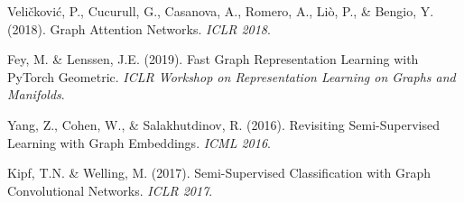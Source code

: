 \documentclass[11pt]{article}
\begin{document}
\begin{enumerate}[leftmargin=*, label={[\arabic*]}]
\item Veli\v{c}kovi\'{c}, P., Cucurull, G., Casanova, A., Romero, A., Li\`{o}, P., \& Bengio, Y. (2018). Graph Attention Networks. \textit{ICLR 2018}.
\item Fey, M. \& Lenssen, J.E. (2019). Fast Graph Representation Learning with PyTorch Geometric. \textit{ICLR Workshop on Representation Learning on Graphs and Manifolds}.
\item Yang, Z., Cohen, W., \& Salakhutdinov, R. (2016). Revisiting Semi-Supervised Learning with Graph Embeddings. \textit{ICML 2016}.
\item Kipf, T.N. \& Welling, M. (2017). Semi-Supervised Classification with Graph Convolutional Networks. \textit{ICLR 2017}.
\end{enumerate}
\end{document}
